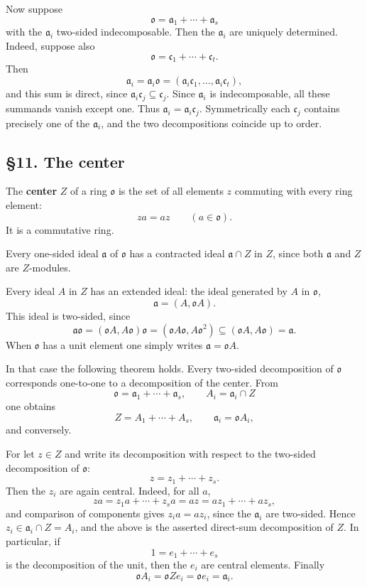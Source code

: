 \documentclass[11pt]{article}
\begin{document}
Now suppose \[
  \mathfrak{o}=\mathfrak a_1+\cdots+\mathfrak a_s
\] with the \(\mathfrak a_i\) two-sided indecomposable. Then the
\(\mathfrak a_i\) are uniquely determined. Indeed, suppose also \[
  \mathfrak{o}=\mathfrak c_1+\cdots+\mathfrak c_t.
\] Then \[
  \mathfrak a_i=\mathfrak a_i\mathfrak{o}=(\mathfrak a_i\mathfrak c_1,\ldots,\mathfrak a_i\mathfrak c_t),
\] and this sum is direct, since
\(\mathfrak a_i\mathfrak c_j\subseteq \mathfrak c_j\). Since
\(\mathfrak a_i\) is indecomposable, all these summands vanish except
one. Thus \(\mathfrak a_i=\mathfrak a_i\mathfrak c_j\). Symmetrically
each \(\mathfrak c_j\) contains precisely one of the \(\mathfrak a_i\),
and the two decompositions coincide up to order.

\subsection{§11. The center}\label{the-center}

The \textbf{center} \(Z\) of a ring \(\mathfrak{o}\) is the set of all
elements \(z\) commuting with every ring element: \[
  za=az\qquad(a\in\mathfrak{o}).
\] It is a commutative ring.

Every one-sided ideal \(\mathfrak a\) of \(\mathfrak{o}\) has a
contracted ideal \(\mathfrak a\cap Z\) in \(Z\), since both
\(\mathfrak a\) and \(Z\) are \(Z\)-modules.

Every ideal \(A\) in \(Z\) has an extended ideal: the ideal generated by
\(A\) in \(\mathfrak{o}\), \[
  \mathfrak a=(A,\mathfrak{o}A).
\] This ideal is two-sided, since \[
  \mathfrak a\mathfrak{o}=(\mathfrak{o}A,A\mathfrak{o})\mathfrak{o}
      = (\mathfrak{o}A\mathfrak{o},A\mathfrak{o}^2)
      \subseteq (\mathfrak{o}A,A\mathfrak{o})=\mathfrak a.
\] When \(\mathfrak{o}\) has a unit element one simply writes
\(\mathfrak a=\mathfrak{o}A\).

In that case the following theorem holds. Every two-sided decomposition
of \(\mathfrak{o}\) corresponds one-to-one to a decomposition of the
center. From \[
  \mathfrak{o}=\mathfrak a_1+\cdots+\mathfrak a_s,
  \qquad
  A_i=\mathfrak a_i\cap Z
\] one obtains \[
  Z=A_1+\cdots+A_s,
  \qquad
  \mathfrak a_i=\mathfrak{o}A_i,
\] and conversely.

For let \(z\in Z\) and write its decomposition with respect to the
two-sided decomposition of \(\mathfrak{o}\): \[
  z=z_1+\cdots+z_s.
\] Then the \(z_i\) are again central. Indeed, for all \(a\), \[
  za=z_1a+\cdots+z_sa=az=az_1+\cdots+az_s,
\] and comparison of components gives \(z_i a=a z_i\), since the
\(\mathfrak a_i\) are two-sided. Hence
\(z_i\in\mathfrak a_i\cap Z=A_i\), and the above is the asserted
direct-sum decomposition of \(Z\). In particular, if \[
  1=e_1+\cdots+e_s
\] is the decomposition of the unit, then the \(e_i\) are central
elements. Finally \[
  \mathfrak{o}A_i=\mathfrak{o}Ze_i=\mathfrak{o}e_i=\mathfrak a_i.
\]
\end{document}
